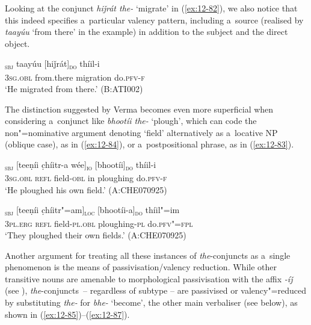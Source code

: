 Looking at the conjunct \textit{hiǰrát the-} `migrate' in (\ref{ex:12-82}), we also notice that this indeed specifies a~particular valency pattern, including a~source (realised by \textit{taayúu} `from there' in the example) in addition to the subject and the direct object. 

\begin{exe}
\ex
\label{ex:12-82}
\gll [tíi]\textsubscript{\textsc{sbj}} taayúu [hiǰrát]\textsubscript{\textsc{do}} thíil-i  \\
\textsc{3sg.obl} from.there migration do.\textsc{pfv-f} \\
\glt `He migrated from there.' (B:ATI002)
\end{exe}

The distinction suggested by Verma becomes even more superficial when considering a~conjunct like \textit{bhootíi the-} `plough', which can code the non"=nominative argument denoting `field' alternatively as a~locative NP (oblique case), as in (\ref{ex:12-84}), or a~postpositional phrase, as in (\ref{ex:12-83}).

\begin{exe}
\ex
\label{ex:12-83}
\gll [tíi]\textsubscript{\textsc{sbj}} [teeṇíi c̣híitr-a wée]\textsubscript{\textsc{io}} [bhootíi]\textsubscript{\textsc{do}} thíil-i  \\
\textsc{3sg.obl} \textsc{refl} field-\textsc{obl} in ploughing do.\textsc{pfv-f} \\
\glt `He ploughed his own field.' (A:CHE070925)
\end{exe}
\begin{exe}
\ex
\label{ex:12-84}
\gll [taním]\textsubscript{\textsc{sbj}} [teeṇíi c̣híitr"=am]\textsubscript{\textsc{loc}} [bhootíi-a]\textsubscript{\textsc{do}} thíil"=im  \\
\textsc{3pl.erg} \textsc{refl} field-\textsc{pl.obl} ploughing-\textsc{pl} do.\textsc{pfv"=fpl} \\
\glt `They ploughed their own fields.' (A:CHE070925)
\end{exe}

Another argument for treating all these instances of \textit{the}-conjuncts as a~single phenomenon is the means of passivisation/valency reduction. While other transitive nouns are amenable to morphological passivisation with the affix \textit{-íǰ} (see ), \textit{the}-conjuncts~-- regardless of subtype -- are passivised or valency"=reduced by substituting \textit{the-} for \textit{bhe-} `become', the other main verbaliser (see below), as shown in (\ref{ex:12-85})--(\ref{ex:12-87}).


